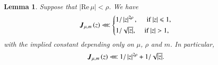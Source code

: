 \documentclass{amsproc}
\def\lp {\left (}
\def\rp {\right )}
\renewcommand{\Re}{{\mathrm{Re}\,}}
\def\bfJ {\boldsymbol J}
\def\shskip{\hskip 0.5 pt}
\theoremstyle{plain}
\newtheorem{lem}[thm]{Lemma}  \newtheorem{prop}[thm]{Proposition}
\numberwithin{equation}{section}
\begin{document}
	\begin{lem}\label{4lem: bounds for J}
		Suppose that $|\Re \mu | < \rho$. We have
		\begin{equation*}
		\bfJ_{ \mu,\shskip   m} \lp z \rp \lll \left\{\begin{split}
		& 1 / \left| z  \right|^{2 \rho}, \hskip 11 pt \text{ if } |z| \leqslant 1, \\
		& 1 /{\textstyle \sqrt {|z|}}, \hskip 10 pt \text{ if } |z| > 1,
		\end{split}\right.
		\end{equation*}
		with the implied constant depending only on $\mu$, $\rho$ and $m$. In particular,
		\begin{equation*}
		\bfJ_{ \mu,\shskip   m} \lp z \rp \lll   1 / \left| z  \right|^{2 \rho} + 1 / {\textstyle \sqrt {|z|}}.
		\end{equation*}
	\end{lem}
	
\end{document}
